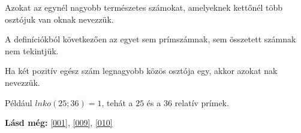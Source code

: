 \begin{defin}
Azokat az egynél nagyobb természetes számokat, amelyeknek kettőnél több
osztójuk van oknak nevezzük.
\end{defin}

\begin{corollary}
A definíciókból következően az egyet sem prímszámnak, sem összetett számnak nem
tekintjük.
\end{corollary}

\begin{defin}
Ha két pozitív egész szám legnagyobb közös osztója egy, akkor azokat
nak nevezzük.

Például $lnko(25; 36) = 1$, tehát a $25$ és a $36$ relatív prímek.
\end{defin}

\textbf{Lásd még:} \ref{001}, \ref{009}, \ref{010}
